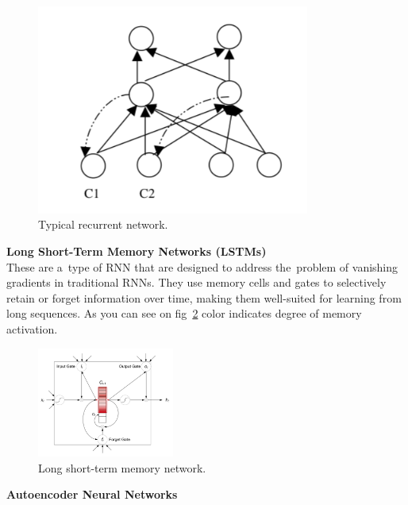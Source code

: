     \begin{center}
        \begin{figure}[!ht]
            \centering
            \includegraphics[width=0.8\textwidth]{figures/rn}
            \caption{Typical recurrent network. \cite{medsker2001recurrent}}
            \label{fig:rn}
        \end{figure}
    \end{center}
\textbf{Long Short-Term Memory Networks (LSTMs)}\\
These are a~type of RNN that are designed to address the~problem of vanishing gradients in traditional RNNs. They use memory cells and gates to selectively retain or forget information over time, making them well-suited for learning from long sequences. As you can see on fig~\ref{fig:ltmn} color indicates degree of memory activation.
    \begin{center}
        \begin{figure}[!ht]
            \centering
            \includegraphics[width=0.4\textwidth]{figures/ltmn}
            \caption{Long short-term memory network. \cite{cheng2016long}}
            \label{fig:ltmn}
        \end{figure}
    \end{center}
\textbf{Autoencoder Neural Networks}\\
